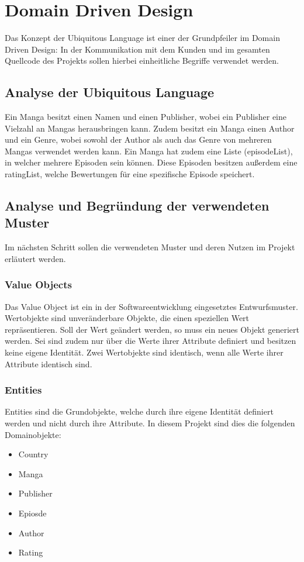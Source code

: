 \chapter{Domain Driven Design}
Das Konzept der Ubiquitous Language ist einer der Grundpfeiler im Domain Driven Design: In der Kommunikation mit dem Kunden und im gesamten Quellcode des Projekts sollen hierbei einheitliche Begriffe verwendet werden.

    \section{Analyse der Ubiquitous Language}
    Ein Manga besitzt einen Namen und einen Publisher, wobei ein Publisher eine Vielzahl an Mangas herausbringen kann. Zudem besitzt ein Manga einen Author und ein Genre, wobei sowohl der Author als auch das Genre von mehreren Mangas verwendet werden kann. Ein Manga hat zudem eine Liste (episodeList), in welcher mehrere Episoden sein können. Diese Episoden besitzen außerdem eine ratingList, welche Bewertungen für eine spezifische Episode speichert.
    
    \section{Analyse und Begründung der verwendeten Muster}
    Im nächsten Schritt sollen die verwendeten Muster und deren Nutzen im Projekt erläutert werden.
    
        \subsection{Value Objects}
        Das Value Object ist ein in der Softwareentwicklung eingesetztes Entwurfsmuster. Wertobjekte sind unveränderbare Objekte, die einen speziellen Wert repräsentieren. Soll der Wert geändert werden, so muss ein neues Objekt generiert werden. Sei sind zudem nur über die Werte ihrer Attribute definiert und besitzen keine eigene Identität. Zwei Wertobjekte sind identisch, wenn alle Werte ihrer Attribute identisch sind.
        
        \subsection{Entities}
        Entities sind die Grundobjekte, welche durch ihre eigene Identität definiert werden und nicht durch ihre Attribute. In diesem Projekt sind dies die folgenden Domainobjekte:
        \begin{itemize}
            \item Country 
            \item Manga
            \item Publisher
            \item Epiosde
            \item Author
            \item Rating
        \end{itemize}
        
